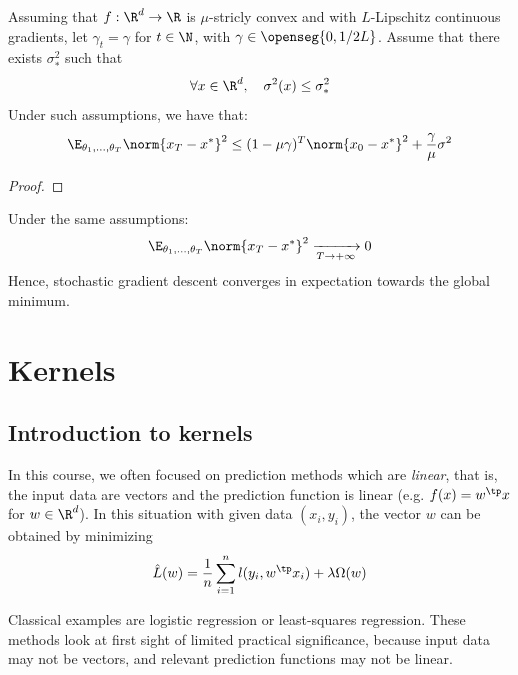 \documentclass{../cs-classes/cs-classes}
\begin{document}
\begin{theorem}
    Assuming that $f:\R^d\to\R$ is $\mu$-stricly convex and with $L$-Lipschitz continuous gradients, let $\gamma_t=\gamma$ for $t\in\N$, with $\gamma\in\openseg{0, 1/2L}$. Assume that there exists $\sigma^2_*$ such that
    \begin{equation*}
        \forall x\in\R^d, \quad \sigma^2(x)\leq\sigma^2_*
    \end{equation*}
    Under such assumptions, we have that:
    \begin{equation*}
        \E_{\theta_1,\dots,\theta_T}\norm{x_T-x^*}^2 \leq (1-\mu\gamma)^T\norm{x_0-x^*}^2+\frac{\gamma}{\mu}\sigma^2
    \end{equation*}
\end{theorem}
\begin{proof}
\end{proof}

\begin{corollary}
    Under the same assumptions:
    \begin{equation*}
        \E_{\theta_1,\dots,\theta_T}\norm{x_T-x^*}^2 \xrightarrow[T\to+\infty]{} 0
    \end{equation*}
    Hence, stochastic gradient descent converges in expectation towards the global minimum.
\end{corollary}

\section{Kernels}
\subsection{Introduction to kernels}
In this course, we often focused on prediction methods which are \emph{linear}, that is, the input data are vectors and the prediction function is linear (e.g. $f(x)=w^\tp x$ for $w\in\R^d$). In this situation with given data $(x_i, y_i)$, the vector $w$ can be obtained by minimizing
\begin{equation*}
    \hat{L}(w)=\frac{1}{n}\sum_{i=1}^n l(y_i, w^\tp x_i) + \lambda \Omega(w)
\end{equation*}

Classical examples are logistic regression or least-squares regression. These methods look at first sight of limited practical significance, because input data may not be vectors, and relevant prediction functions may not be linear.
\end{document}
